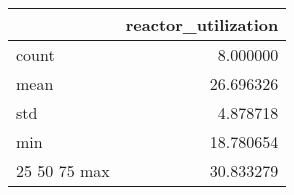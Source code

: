 \begin{tabular}{lr}
\toprule
 & reactor\_utilization \\
\midrule
count & 8.000000 \\
mean & 26.696326 \\
std & 4.878718 \\
min & 18.780654 \\
25%
50%
75%
max & 30.833279 \\
\bottomrule
\end{tabular}


